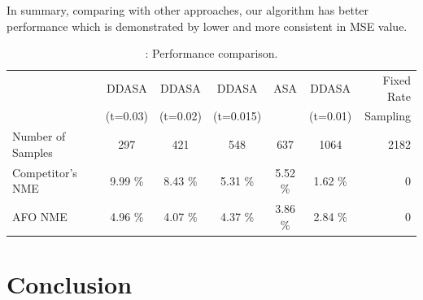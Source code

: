 In summary, comparing with other approaches, our algorithm has better performance which is demonstrated by lower and more consistent in MSE value. 

\begin{table}[h]
	\centering
	\begin{tabular}{l*{6}{c}r}
		&  & DDASA & DDASA & DDASA & ASA & DDASA &Fixed Rate   \\
		&  & (t=0.03) & (t=0.02) & (t=0.015) & & (t=0.01)& Sampling  \\
		\hline
		Number of Samples &  & 297 & 421 & 548 & 637 & 1064 & 2182   \\
		Competitor's NME            &   & 9.99 \% & 8.43 \% & 5.31 \% & 5.52 \% & 1.62 \%&  0   \\
		AFO NME         & & 4.96  \%&  4.07 \% &  4.37 \% &  3.86 \% & 2.84 \%&  0\\
	\end{tabular}
	\caption{: Performance comparison.}
	\label{tab: performance comaprison}%
\end{table}%

\section{Conclusion}
